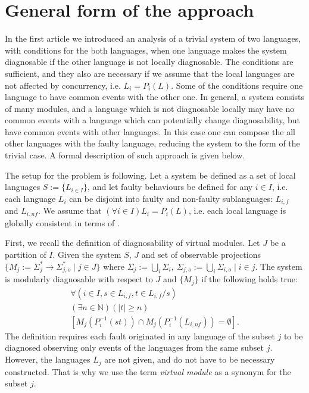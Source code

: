 \documentclass[a4paper, 10pt, conference]{ieeeconf}
\begin{document}
\section{General form of the approach}
\label{sec:General}
In the first article we introduced an analysis of a trivial system of two
languages, with conditions for the both languages, when one language makes the
system diagnosable if the other language is not locally diagnosable.
The conditions are sufficient, and they also are necessary if we assume that the
local languages are not affected by concurrency, i.e. $L_i = P_i(L)$. Some of
the conditions require one language to have common events with the other one. In
general, a system consists of many modules, and a language which is not
diagnosable locally may have no common events with a language which can
potentially change diagnosability, but have common events with other languages.
In this case one can compose the all other languages with the faulty language,
reducing the system to the form of the trivial case. A formal description of
such approach is given below.

The setup for the problem is following. Let a system be defined as a set of
local languages $S := \{L_{i\in I}\}$, and let faulty behaviours be defined for
any $i \in I$, i.e. each language $L_i$ can be disjoint into faulty and
non-faulty sublanguages: $L_{i,f}$ and $L_{i,nf}$. We assume that $(\forall i
\in I) L_i = P_i(L)$, i.e. each local language is globally consistent in terms
of \cite{su_global_2005}.

First, we recall the definition of diagnosability of virtual modules. Let $J$ be
a partition of $I$. Given the system $S$, $J$ and set of observable
projections $\{M_j := \Sigma_j^* \rightarrow \Sigma_{j,o}^* \mid j \in J \}$
where $\Sigma_j := \bigcup_i \Sigma_i,~ 
	\Sigma_{j,o} := \bigcup_i \Sigma_{i,o} \mid 
	i\in j$. 
The system is modularly diagnosable with respect to $J$ and $\{M_j\}$ 
if the following holds true:
\begin{equation}
	\begin{array}{l}
		\forall(i \in I, s \in L_{i,f}, t \in L_{i,f}/s)
		\\
		(\exists n \in \mathbb{N})
		(|t| \geq n)
		\\
		\left[ M_j(P_i^{-1}(st)) \cap M_j(P_i^{-1}(L_{i,nf})) = \emptyset \right].
	\end{array}
\end{equation}
The definition requires each fault originated in any language of the subset $j$
to be diagnosed observing only events of the languages from the same subset $j$.
However, the languages $L_j$ are not given, and do not have to be necessary
constructed. That is why we use the term \emph{virtual module} as a synonym for
the subset $j$.
\end{document}
